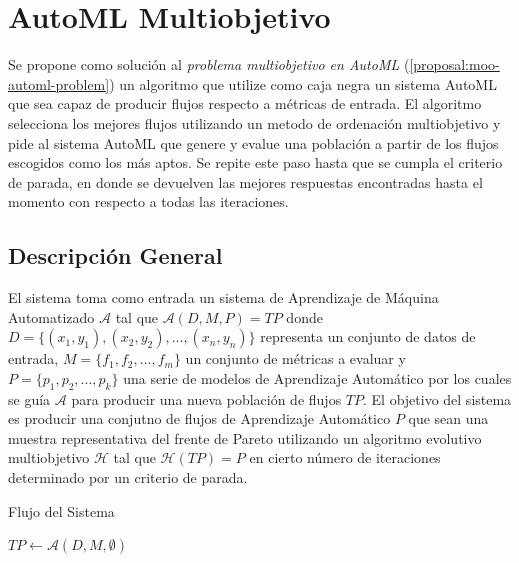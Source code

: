 
\chapter{AutoML Multiobjetivo}\label{chapter:proposal}

Se propone como soluci\'on al  \textit{problema multiobjetivo en AutoML} (\ref{proposal:moo-automl-problem}) un algoritmo que utilize como caja negra un sistema AutoML que sea capaz de producir flujos respecto a m\'etricas de entrada. El algoritmo selecciona los mejores flujos utilizando un metodo de ordenaci\'on multiobjetivo y pide al sistema AutoML que genere y evalue una poblaci\'on a partir de los flujos escogidos como los m\'as aptos. 
Se repite este paso hasta que se cumpla el criterio de parada, en donde se devuelven las mejores respuestas encontradas hasta el momento con respecto a todas las iteraciones.

\section{Descripci\'on General}
El sistema toma como entrada un sistema de Aprendizaje de M\'aquina Automatizado $\mathcal{A}$ tal que $\mathcal{A}(D, M, P) = TP$ donde $D = \{(x_1, y_1), (x_2, y_2), ..., (x_n, y_n)\}$ representa un conjunto de datos de entrada, $M = \{f_1, f_2, ..., f_m\}$ un conjunto de m\'etricas a evaluar y $P = \{p_1, p_2, ..., p_k\}$ una serie de modelos de Aprendizaje Autom\'atico por los cuales se gu\'ia $\mathcal{A}$ para producir una nueva poblaci\'on de flujos $TP$. El objetivo del sistema es producir una conjutno de flujos de Aprendizaje Autom\'atico $P$ que sean una muestra representativa del frente de Pareto utilizando un algoritmo evolutivo multiobjetivo  $\mathcal{H}$ tal que $\mathcal{H}(TP) = P$ en cierto n\'umero de iteraciones determinado por un criterio de parada. 

\begin{algorithm}[H]\caption{Flujo del Sistema}
    
    $TP \gets \mathcal{A}(D, M, \emptyset)$ 
\end{algorithm}

